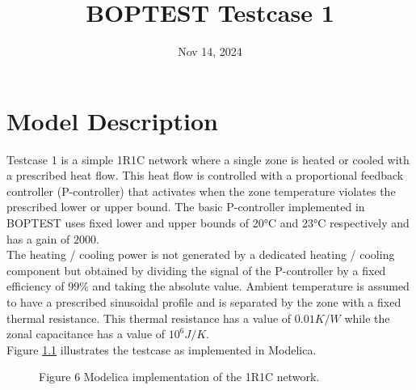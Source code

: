 \documentclass[letterpaper,10pt,english]{sphinxmanual}
\title{BOPTEST Testcase 1}
\date{Nov 14, 2024}
\author{}
\begin{document}
\pagestyle{empty}
\maketitle
\pagestyle{plain}
\sphinxtableofcontents
\pagestyle{normal}
\label{\detokenize{index::doc}}



\chapter{Model Description}
\label{\detokenize{modelDescription:model-description}}\label{\detokenize{modelDescription::doc}}

Testcase 1 is a simple 1R1C network where a single zone is heated or cooled with a prescribed heat flow. This heat flow is controlled with a proportional feedback controller (P-controller) that activates when the zone temperature violates the prescribed lower or upper bound. The basic P-controller implemented in BOPTEST uses fixed lower and upper bounds of 20°C and 23°C respectively and has a gain of $2000$.\\

The heating / cooling power is not generated by a dedicated heating / cooling component but obtained by dividing the signal of the P-controller by a fixed efficiency of 99\% and taking the absolute value. Ambient temperature is assumed to have a prescribed sinusoidal profile and is separated by the zone with a fixed thermal resistance. This thermal resistance has a value of $0.01 K/W$ while the zonal capacitance has a value of $10^6 J/K$.\\

Figure \ref{\detokenize{modelicaWhole}} illustrates the testcase as implemented in Modelica.

\begin{figure}[htbp]
\centering
\capstart
\noindent{}
\caption{Figure 6 \textendash{} Modelica implementation of the 1R1C network.}\label{\detokenize{modelicaWhole}}\end{figure}


\renewcommand{\indexname}{Index}
\printindex
\end{document}
